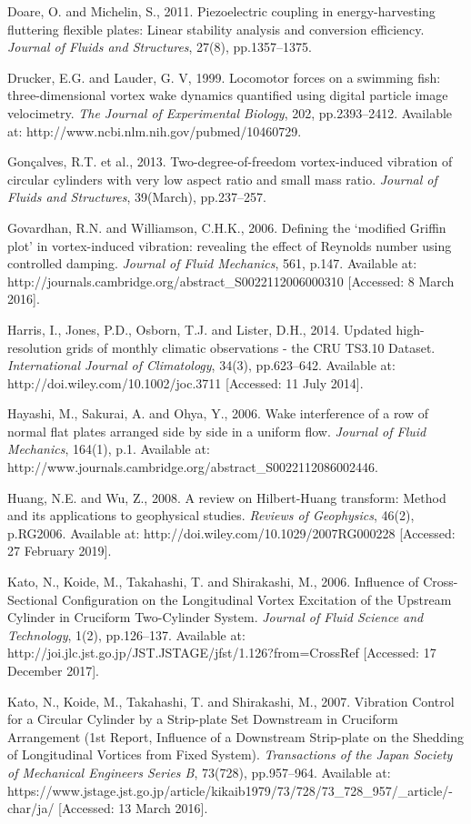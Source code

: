 \documentclass[]{article}
\begin{document}
Doare, O. and Michelin, S., 2011. Piezoelectric coupling in
energy-harvesting fluttering flexible plates: Linear stability analysis
and conversion efficiency. \emph{Journal of Fluids and Structures},
27(8), pp.1357--1375.

Drucker, E.G. and Lauder, G. V, 1999. Locomotor forces on a swimming
fish: three-dimensional vortex wake dynamics quantified using digital
particle image velocimetry. \emph{The Journal of Experimental Biology},
202, pp.2393--2412. Available at:
http://www.ncbi.nlm.nih.gov/pubmed/10460729.

Gonçalves, R.T. et al., 2013. Two-degree-of-freedom vortex-induced
vibration of circular cylinders with very low aspect ratio and small
mass ratio. \emph{Journal of Fluids and Structures}, 39(March),
pp.237--257.

Govardhan, R.N. and Williamson, C.H.K., 2006. Defining the `modified
Griffin plot' in vortex-induced vibration: revealing the effect of
Reynolds number using controlled damping. \emph{Journal of Fluid
Mechanics}, 561, p.147. Available at:
http://journals.cambridge.org/abstract\_S0022112006000310 {[}Accessed: 8
March 2016{]}.

Harris, I., Jones, P.D., Osborn, T.J. and Lister, D.H., 2014. Updated
high-resolution grids of monthly climatic observations - the CRU TS3.10
Dataset. \emph{International Journal of Climatology}, 34(3),
pp.623--642. Available at: http://doi.wiley.com/10.1002/joc.3711
{[}Accessed: 11 July 2014{]}.

Hayashi, M., Sakurai, A. and Ohya, Y., 2006. Wake interference of a row
of normal flat plates arranged side by side in a uniform flow.
\emph{Journal of Fluid Mechanics}, 164(1), p.1. Available at:
http://www.journals.cambridge.org/abstract\_S0022112086002446.

Huang, N.E. and Wu, Z., 2008. A review on Hilbert-Huang transform:
Method and its applications to geophysical studies. \emph{Reviews of
Geophysics}, 46(2), p.RG2006. Available at:
http://doi.wiley.com/10.1029/2007RG000228 {[}Accessed: 27 February
2019{]}.

Kato, N., Koide, M., Takahashi, T. and Shirakashi, M., 2006. Influence
of Cross-Sectional Configuration on the Longitudinal Vortex Excitation
of the Upstream Cylinder in Cruciform Two-Cylinder System. \emph{Journal
of Fluid Science and Technology}, 1(2), pp.126--137. Available at:
http://joi.jlc.jst.go.jp/JST.JSTAGE/jfst/1.126?from=CrossRef
{[}Accessed: 17 December 2017{]}.

Kato, N., Koide, M., Takahashi, T. and Shirakashi, M., 2007. Vibration
Control for a Circular Cylinder by a Strip-plate Set Downstream in
Cruciform Arrangement (1st Report, Influence of a Downstream Strip-plate
on the Shedding of Longitudinal Vortices from Fixed System).
\emph{Transactions of the Japan Society of Mechanical Engineers Series
B}, 73(728), pp.957--964. Available at:
https://www.jstage.jst.go.jp/article/kikaib1979/73/728/73\_728\_957/\_article/-char/ja/
{[}Accessed: 13 March 2016{]}.
\end{document}
